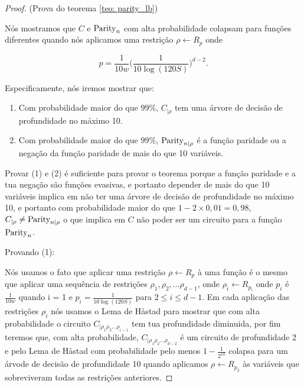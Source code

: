 \begin{proof} (Prova do teorema \ref{teo: parity_lb})

	Nós mostramos que $C$ e $\text{Parity}_{n}$ com alta probabilidade colapsam para funções diferentes quando nós aplicamos uma restrição $\rho \leftarrow R_{p}$ onde
	
	\begin{equation*}
		p = \frac{1}{10w}\bigg( \frac{1}{10\log(120S)} \bigg)^{d - 2}.
	\end{equation*}

	Especificamente, nós iremos mostrar que:
	
	\begin{enumerate}
	
		\item Com probabilidade maior do que $99\%$, $C_{\lvert \rho}$ tem uma árvore de decisão de profundidade no máximo 10.
	
		\item Com probabilidade maior do que $99\%$, $\text{Parity}_{n \lvert \rho}$ é a função paridade ou a negação da função paridade de mais do que 10 variáveis.
	
	\end{enumerate}

	Provar (1) e (2) é suficiente para provar o teorema porque a função paridade e a tua negação são funções evasivas, e portanto depender de mais do que 10 variáveis implica em não ter uma árvore de decisão de profundidade no máximo 10, e portanto com probabilidade maior do que $1 - 2 \times 0,01 = 0,98$, $C_{\lvert \rho} \neq \text{Parity}_{n \lvert \rho}$ o que implica em $C$ não poder ser um circuito para a função $\text{Parity}_{n}$. 

	Provando (1):
	
	Nós usamos o fato que aplicar uma restrição $\rho \leftarrow R_{p}$ à uma função é o mesmo que aplicar uma sequência de restrições $\rho_{1}, \rho_{2}, \dots \rho_{d - 1}$, onde $\rho_{i} \leftarrow R_{p_{i}}$ onde $p_{i}$ é $\frac{1}{10w}$ quando i = 1 e $p_{i} = \frac{1}{10 \log(120S)}$ para $2 \leq i \leq d - 1$. Em cada aplicação das restrições $\rho_{i}$ nós usamos o Lema de Håstad para mostrar que com alta probabilidade o circuito $C_{\lvert \rho_{1}\rho_{2}\dots\rho_{i - 1}}$ tem tua profundidade diminuida, por fim teremos que, com alta probabilidade, $C_{\lvert \rho_{1}\rho_{2}\dots\rho_{d - 2}}$ é um circuito de profundidade 2 e pelo Lema de Håstad com probabilidade pelo menos $1 - \frac{1}{2^{10}}$ colapsa para um árvode de decisão de profundidade 10 quando aplicamos $\rho \leftarrow R_{p_{2}}$ às variáveis que sobreviveram todas as restrições anteriores.
	

\end{proof}
